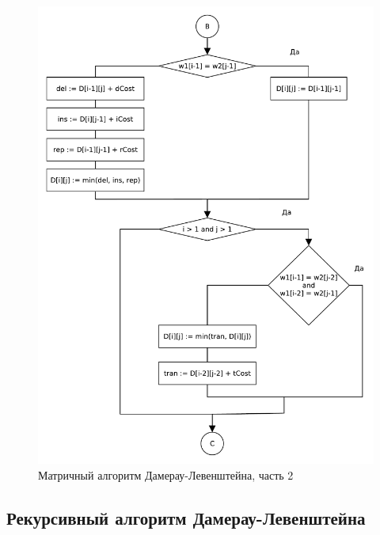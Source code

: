 \begin{figure}[H]
    \centering
    \includegraphics[scale=0.8]{pdf/damerau-levenshteain-part2.pdf}
    \caption{Матричный алгоритм Дамерау-Левенштейна, часть 2}
\end{figure}

\subsection{Рекурсивный алгоритм Дамерау-Левенштейна}


